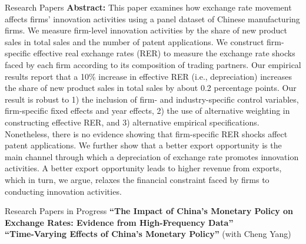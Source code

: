 \documentclass{resume_liang} %
\begin{document}
\begin{rSection}{Research Papers}
\textbf{Abstract:} This paper examines how exchange rate movement affects firms' innovation activities using a panel dataset of Chinese manufacturing firms. We measure firm-level innovation activities by the share of new product sales in total sales and the number of patent applications. We construct firm-specific effective real exchange rates (RER) to measure the exchange rate shocks faced by each firm according to its composition of trading partners. Our empirical results report that a 10\% increase in effective RER (i.e., depreciation) increases the share of new product sales in total sales by about 0.2 percentage points. Our result is robust to 1) the inclusion of firm- and industry-specific control variables, firm-specific fixed effects and year effects, 2) the use of alternative weighting in constructing effective RER, and 3) alternative empirical specifications. Nonetheless, there is no evidence showing that firm-specific RER shocks affect patent applications. We further show that a better export opportunity is the main channel through which a depreciation of exchange rate promotes innovation activities. A better export opportunity leads to higher revenue from exports, which in turn, we argue, relaxes the financial constraint faced by firms to conducting innovation activities. \\
\end{rSection}
\bigskip \bigskip




\begin{rSection}{Research Papers in Progress}
	\textbf{``The Impact of China's Monetary Policy on Exchange Rates: Evidence from High-Frequency Data''}\vspace{0.2cm}\\
\textbf{``Time-Varying Effects of China's Monetary Policy''} (with Cheng Yang)\\
\end{rSection}
\bigskip \bigskip 
\end{document}

